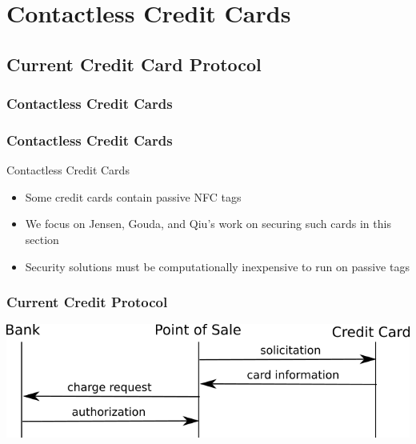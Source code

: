 \documentclass[unknownkeysallowed]{beamer}
\begin{document}
\section{Contactless Credit Cards}
\subsection{Current Credit Card Protocol}
\begin{frame}
  \frametitle{Contactless Credit Cards}
    \begin{center}\begin{minipage}{.9\textwidth}
    \tableofcontents[currentsubsection, hideothersubsections, sectionstyle=show/shaded]
    \end{minipage}\end{center}
\end{frame}
%
\begin{frame}
\frametitle{Contactless Credit Cards}
  \begin{center}
  \begin{minipage}{.9\textwidth}
  \begin{block}{Contactless Credit Cards}
    \begin{itemize}
      \item{Some credit cards contain passive NFC tags}
      \item{We focus on Jensen, Gouda, and Qiu's work on securing such cards in this section}
      \item{Security solutions must be computationally inexpensive to run on passive tags}
    \end{itemize}
  \end{block}
  \end{minipage}
  \end{center}
\end{frame}

\begin{frame}
\frametitle{Current Credit Protocol}
  \begin{center}
  \includegraphics[scale=.5]{../TomPaper/figures/CCcurrent.png}
  \end{center}
\end{frame}
\end{document}
